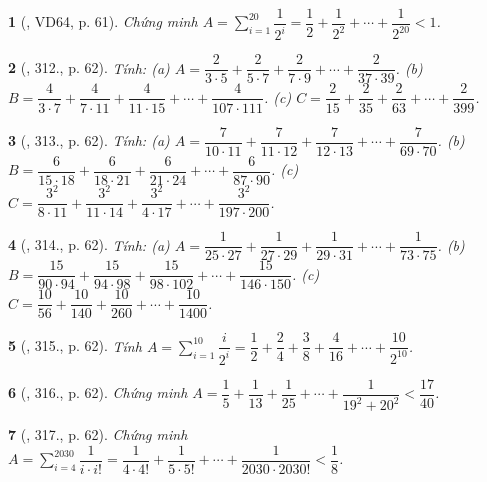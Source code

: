 \documentclass{article}
\newtheorem{baitoan}{}
\begin{document}
\begin{baitoan}[\cite{Tuyen_Toan_6}, VD64, p. 61]
	Chứng minh $A = \sum_{i=1}^{20} \dfrac{1}{2^i} = \dfrac{1}{2} + \dfrac{1}{2^2} + \cdots + \dfrac{1}{2^{20}} < 1$.
\end{baitoan}

\begin{baitoan}[\cite{Tuyen_Toan_6}, 312., p. 62]
	Tính: (a) $A = \dfrac{2}{3\cdot5} + \dfrac{2}{5\cdot7} + \dfrac{2}{7\cdot9} + \cdots + \dfrac{2}{37\cdot39}$. (b) $B = \dfrac{4}{3\cdot7} + \dfrac{4}{7\cdot11} + \dfrac{4}{11\cdot15} + \cdots + \dfrac{4}{107\cdot111}$. (c) $C = \dfrac{2}{15} + \dfrac{2}{35} + \dfrac{2}{63} + \cdots + \dfrac{2}{399}$.
\end{baitoan}

\begin{baitoan}[\cite{Tuyen_Toan_6}, 313., p. 62]
	Tính: (a) $A = \dfrac{7}{10\cdot11} + \dfrac{7}{11\cdot12} + \dfrac{7}{12\cdot13} + \cdots + \dfrac{7}{69\cdot70}$. (b) $B = \dfrac{6}{15\cdot18} + \dfrac{6}{18\cdot21} + \dfrac{6}{21\cdot24} + \cdots + \dfrac{6}{87\cdot90}$. (c) $C = \dfrac{3^2}{8\cdot11} + \dfrac{3^2}{11\cdot14} + \dfrac{3^2}{4\cdot17} + \cdots + \dfrac{3^2}{197\cdot200}$.
\end{baitoan}

\begin{baitoan}[\cite{Tuyen_Toan_6}, 314., p. 62]
	Tính: (a) $A = \dfrac{1}{25\cdot27} + \dfrac{1}{27\cdot29} + \dfrac{1}{29\cdot31} + \cdots + \dfrac{1}{73\cdot75}$. (b) $B = \dfrac{15}{90\cdot94} + \dfrac{15}{94\cdot98} + \dfrac{15}{98\cdot102} + \cdots + \dfrac{15}{146\cdot150}$. (c) $C = \dfrac{10}{56} + \dfrac{10}{140} + \dfrac{10}{260} + \cdots + \dfrac{10}{1400}$.
\end{baitoan}

\begin{baitoan}[\cite{Tuyen_Toan_6}, 315., p. 62]
	Tính $A = \sum_{i=1}^{10} \dfrac{i}{2^i} = \dfrac{1}{2} + \dfrac{2}{4} + \dfrac{3}{8} + \dfrac{4}{16} + \cdots + \dfrac{10}{2^{10}}$.
\end{baitoan}

\begin{baitoan}[\cite{Tuyen_Toan_6}, 316., p. 62]
	Chứng minh $A = \dfrac{1}{5} + \dfrac{1}{13} + \dfrac{1}{25} + \cdots + \dfrac{1}{19^2 + 20^2} < \dfrac{17}{40}$.
\end{baitoan}

\begin{baitoan}[\cite{Tuyen_Toan_6}, 317., p. 62]
	Chứng minh $A = \sum_{i=4}^{2030} \dfrac{1}{i\cdot i!} = \dfrac{1}{4\cdot4!} + \dfrac{1}{5\cdot5!} + \cdots + \dfrac{1}{2030\cdot2030!} < \dfrac{1}{8}$.
\end{baitoan}
\end{document}
